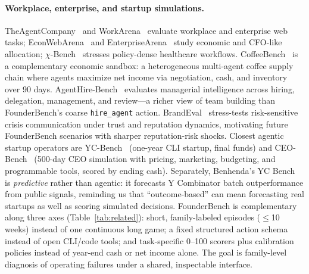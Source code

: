 \documentclass[sigconf,review]{acmart}
\begin{document}
\paragraph{Workplace, enterprise, and startup simulations.}
TheAgentCompany~\cite{xu2025theagentcompany} and WorkArena~\cite{drouin2024workarena} evaluate workplace and enterprise web tasks; EconWebArena~\cite{liu2026econwebarena} and EnterpriseArena~\cite{han2026enterprisearena} study economic and CFO-like allocation; $\chi$-Bench~\cite{chen2026chibench} stresses policy-dense healthcare workflows.
CoffeeBench~\cite{sugiura2026coffeebench} is a complementary economic sandbox: a heterogeneous multi-agent coffee supply chain where agents maximize net income via negotiation, cash, and inventory over 90 days.
AgentHire-Bench~\cite{agenthire2026} evaluates managerial intelligence across hiring, delegation, management, and review---a richer view of team building than FounderBench's coarse \texttt{hire\_agent} action.
BrandEval~\cite{brandeval2026} stress-tests risk-sensitive crisis communication under trust and reputation dynamics, motivating future FounderBench scenarios with sharper reputation-risk shocks.
Closest agentic startup operators are YC-Bench~\cite{he2026ycbench} (one-year CLI startup, final funds) and CEO-Bench~\cite{chen2026ceobench} (500-day CEO simulation with pricing, marketing, budgeting, and programmable tools, scored by ending cash).
Separately, Benhenda's YC Bench~\cite{benhenda2026ycbenchforecast} is \emph{predictive} rather than agentic: it forecasts Y Combinator batch outperformance from public signals, reminding us that ``outcome-based'' can mean forecasting real startups as well as scoring simulated decisions.
FounderBench is complementary along three axes (Table~\ref{tab:related}): short, family-labeled episodes ($\leq$10 weeks) instead of one continuous long game; a fixed structured action schema instead of open CLI/code tools; and task-specific 0--100 scorers plus calibration policies instead of year-end cash or net income alone.
The goal is family-level diagnosis of operating failures under a shared, inspectable interface.
\end{document}
